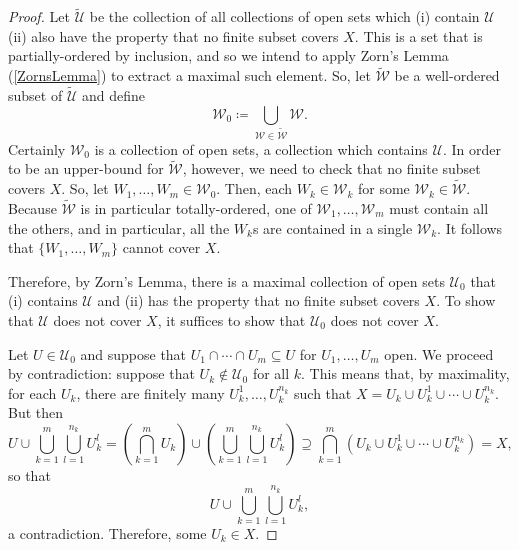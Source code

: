 \begin{thm}
\begin{proof}
Let $\tilde{\mathcal{U}}$ be the collection of all collections of open sets which (i) contain $\mathcal{U}$ (ii) also have the property that no finite subset covers $X$.  This is a set that is partially-ordered by inclusion, and so we intend to apply Zorn's Lemma (\cref{ZornsLemma}) to extract a maximal such element.  So, let $\tilde{\mathcal{W}}$ be a well-ordered subset of $\tilde{\mathcal{U}}$ and define
\begin{equation}
\mathcal{W}_0\coloneqq \bigcup _{\mathcal{W}\in \tilde{\mathcal{W}}}\mathcal{W}.
\end{equation}
Certainly $\mathcal{W}_0$ is a collection of open sets, a collection which contains $\mathcal{U}$.  In order to be an upper-bound for $\tilde{\mathcal{W}}$, however, we need to check that no finite subset covers $X$.  So, let $W_1,\ldots ,W_m\in \mathcal{W}_0$.  Then, each $W_k\in \mathcal{W}_k$ for some $\mathcal{W}_k\in \tilde{\mathcal{W}}$.  Because $\tilde{\mathcal{W}}$ is in particular totally-ordered, one of $\mathcal{W}_1,\ldots ,\mathcal{W}_m$ must contain all the others, and in particular, all the $W_k$s are contained in a single $\mathcal{W}_k$.  It follows that $\{ W_1,\ldots ,W_m\}$ cannot cover $X$.

Therefore, by Zorn's Lemma, there is a maximal collection of open sets $\mathcal{U}_0$ that (i) contains $\mathcal{U}$ and (ii) has the property that no finite subset covers $X$.  To show that $\mathcal{U}$ does not
cover $X$, it suffices to show that $\mathcal{U}_0$ does not cover $X$.

Let $U\in \mathcal{U}_0$ and suppose that $U_1\cap \cdots \cap U_m\subseteq U$ for $U_1,\ldots ,U_m$ open.  We proceed by contradiction:  suppose that $U_k\notin \mathcal{U}_0$ for all $k$.  This means that, by maximality, for each $U_k$, there are finitely many $U_k^1,\ldots ,U_k^{n_k}$ such that $X=U_k\cup U_k^1\cup \cdots \cup U_k^{n_k}$.  But then
\begin{equation}
U\cup \bigcup _{k=1}^m\bigcup _{l=1}^{n_k}U_k^l=\left( \bigcap _{k=1}^mU_k\right) \cup \left( \bigcup _{k=1}^m\bigcup _{l=1}^{n_k}U_k^l\right) \supseteq \bigcap _{k=1}^m\left( U_k\cup U_k^1\cup \cdots \cup U_k^{n_k}\right) =X,
\end{equation}
so that
\begin{equation}
U\cup \bigcup _{k=1}^m\bigcup _{l=1}^{n_k}U_k^l,
\end{equation}
a contradiction.  Therefore, some $U_k\in X$.


\end{proof}
\end{thm}
